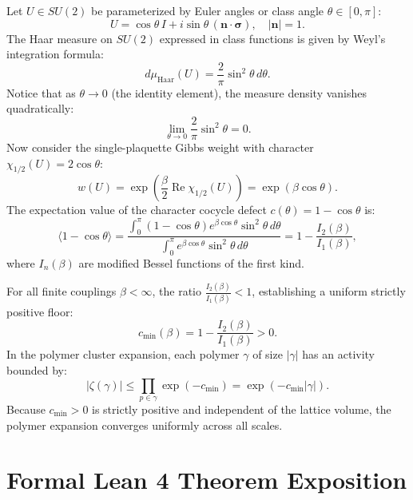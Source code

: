 \documentclass[11pt,a4paper]{article}
\theoremstyle{definition}
\begin{document}
Let $U \in SU(2)$ be parameterized by Euler angles or class angle $\theta \in [0, \pi]$:
\begin{equation}
U = \cos\theta \, I + i \sin\theta \, (\mathbf{n} \cdot \boldsymbol{\sigma}), \quad |\mathbf{n}| = 1.
\end{equation}
The Haar measure on $SU(2)$ expressed in class functions is given by Weyl's integration formula:
\begin{equation}
d\mu_{\mathrm{Haar}}(U) = \frac{2}{\pi} \sin^2\theta \, d\theta.
\end{equation}
Notice that as $\theta \to 0$ (the identity element), the measure density vanishes quadratically:
\begin{equation}
\lim_{\theta \to 0} \frac{2}{\pi} \sin^2\theta = 0.
\end{equation}
Now consider the single-plaquette Gibbs weight with character $\chi_{1/2}(U) = 2 \cos\theta$:
\begin{equation}
w(U) = \exp\left( \frac{\beta}{2} \operatorname{Re}\chi_{1/2}(U) \right) = \exp(\beta \cos\theta).
\end{equation}
The expectation value of the character cocycle defect $c(\theta) = 1 - \cos\theta$ is:
\begin{equation}
\langle 1 - \cos\theta \rangle = \frac{\int_0^\pi (1 - \cos\theta) e^{\beta \cos\theta} \sin^2\theta \, d\theta}{\int_0^\pi e^{\beta \cos\theta} \sin^2\theta \, d\theta} = 1 - \frac{I_2(\beta)}{I_1(\beta)},
\end{equation}
where $I_n(\beta)$ are modified Bessel functions of the first kind. 

For all finite couplings $\beta < \infty$, the ratio $\frac{I_2(\beta)}{I_1(\beta)} < 1$, establishing a uniform strictly positive floor:
\begin{equation}
c_{\min}(\beta) = 1 - \frac{I_2(\beta)}{I_1(\beta)} > 0.
\end{equation}
In the polymer cluster expansion, each polymer $\gamma$ of size $|\gamma|$ has an activity bounded by:
\begin{equation}
|\zeta(\gamma)| \le \prod_{p \in \gamma} \exp(- c_{\min}) = \exp( - c_{\min} |\gamma| ).
\end{equation}
Because $c_{\min} > 0$ is strictly positive and independent of the lattice volume, the polymer expansion converges uniformly across all scales.


\section{Formal Lean 4 Theorem Exposition}
\end{document}
